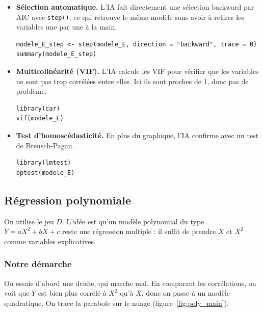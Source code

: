 \documentclass[11pt,a4paper]{article}
\begin{document}
\begin{itemize}
    \item \textbf{Sélection automatique.} L'IA fait directement une sélection backward par AIC avec \texttt{step()}, ce qui retrouve le même modèle sans avoir à retirer les variables une par une à la main.

\begin{lstlisting}
modele_E_step <- step(modele_E, direction = "backward", trace = 0)
summary(modele_E_step)
\end{lstlisting}

    \item \textbf{Multicolinéarité (VIF).} L'IA calcule les VIF pour vérifier que les variables ne sont pas trop corrélées entre elles. Ici ils sont proches de 1, donc pas de problème.

\begin{lstlisting}
library(car)
vif(modele_E)
\end{lstlisting}

    \item \textbf{Test d'homoscédasticité.} En plus du graphique, l'IA confirme avec un test de Breusch-Pagan.

\begin{lstlisting}
library(lmtest)
bptest(modele_E)
\end{lstlisting}

\end{itemize}

\subsection{Régression polynomiale}

On utilise le jeu $D$. L'idée est qu'un modèle polynomial du type $Y = a X^2 + b X + c$ reste une régression multiple : il suffit de prendre $X$ et $X^2$ comme variables explicatives.

\subsubsection{Notre démarche}

On essaie d'abord une droite, qui marche mal. En comparant les corrélations, on voit que $Y$ est bien plus corrélé à $X^2$ qu'à $X$, donc on passe à un modèle quadratique. On trace la parabole sur le nuage (figure~\ref{fig:poly_main}).
\end{document}
